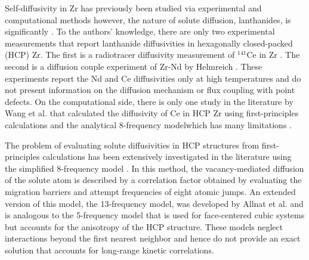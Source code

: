 \documentclass[preprint,12pt]{elsarticle}
\providecommand{\DIFadd}[1]{{\bf #1}} %
\providecommand{\DIFdel}[1]{} %
\providecommand{\DIFaddbegin}{\protect\color{blue}} %
\providecommand{\DIFaddend}{\protect\color{black}} %
\providecommand{\DIFdelbegin}{\protect\color{red}} %
\providecommand{\DIFdelend}{\protect\color{black}} %
\newcommand{\DIFscaledelfig}{0.5}
\newlength{\DIFdelgraphicswidth} %
\newlength{\DIFdelgraphicsheight} %
\newcommand{\DIFaddincludegraphics}[2][]{{\color{blue}\fbox{\DIFOincludegraphics[#1]{#2}}}} %
\newcommand{\DIFdelincludegraphics}[2][]{%
\sbox{\DIFdelgraphicsbox}{\DIFOincludegraphics[#1]{#2}}%
\settoboxwidth{\DIFdelgraphicswidth}{\DIFdelgraphicsbox} %
\settoboxtotalheight{\DIFdelgraphicsheight}{\DIFdelgraphicsbox} %
\scalebox{\DIFscaledelfig}{%
\parbox[b]{\DIFdelgraphicswidth}{\usebox{\DIFdelgraphicsbox}\\[-\baselineskip] \rule{\DIFdelgraphicswidth}{0em}}\llap{\resizebox{\DIFdelgraphicswidth}{\DIFdelgraphicsheight}{%
\setlength{\unitlength}{\DIFdelgraphicswidth}%
\begin{picture}(1,1)%
\thicklines\linethickness{2pt} %
{\color[rgb]{1,0,0}\put(0,0){\framebox(1,1){}}}%
{\color[rgb]{1,0,0}\put(0,0){\line( 1,1){1}}}%
{\color[rgb]{1,0,0}\put(0,1){\line(1,-1){1}}}%
\end{picture}%
}\hspace*{3pt}}} %
} %
\DeclareRobustCommand{\DIFaddbegin}{\DIFOaddbegin \let\includegraphics\DIFaddincludegraphics} %
\DeclareRobustCommand{\DIFaddend}{\DIFOaddend \let\includegraphics\DIFOincludegraphics} %
\DeclareRobustCommand{\DIFdelbegin}{\DIFOdelbegin \let\includegraphics\DIFdelincludegraphics} %
\DeclareRobustCommand{\DIFdelend}{\DIFOaddend \let\includegraphics\DIFOincludegraphics} %
\begin{document}
Self-diffusivity in Zr has previously been studied via experimental \cite{hood_alpha-zr_1995, hood_self-_1997} and computational methods \cite{samolyuk_analysis_2014, verite_anisotropy_2007, pasianot_issues_2012}\DIFdelbegin \DIFdel{, }\DIFdelend \DIFaddbegin \DIFadd{; }\DIFaddend however, the nature of solute diffusion, \DIFdelbegin \DIFdel{especially }\DIFdelend \DIFaddbegin \DIFadd{in particular }\DIFaddend lanthanides, is significantly \DIFdelbegin \DIFdel{less well-explored}\DIFdelend \DIFaddbegin \DIFadd{under-explored}\DIFaddend . To the authors' knowledge, there are only two experimental measurements that report lanthanide diffusivities in hexagonally closed-packed (HCP) Zr. The first is a radiotracer diffusivity measurement of $^{141}$Ce in Zr \cite{paul_diffusion_1968}. The second is a diffusion couple experiment of Zr-Nd by Helmreich \cite{helmreich_diffusion_2014}. These experiments report the Nd and Ce diffusivities only at high temperatures and do not present information on the diffusion mechanism or flux coupling with point defects. On the computational side, there is only one study in the literature by Wang et al. \cite{wang_first_2019} that calculated the diffusivity of Ce in HCP Zr using first-principles calculations and the analytical 8-frequency model\DIFaddbegin \DIFadd{, }\DIFaddend which has many limitations \cite{agarwal_exact_2017}. 

The problem of evaluating solute diffusivities in HCP structures from first-principles calculations has been extensively investigated in the literature \cite{ganeshan_first-principles_2011, lu_first-principles_2018, wang_first_2019} using the simplified 8-frequency model \cite{ghate_screened_1964, batra_anisotropic_1967}. In this method, the vacancy-mediated diffusion of the solute atom is described by a correlation factor obtained by evaluating the migration barriers and attempt frequencies of eight atomic jumps. An extended version of this model, the 13-frequency model, was developed by Allnat et al. \cite{allnatt_atomic_2003} and is analogous to the 5-frequency model that is used for face-centered cubic \DIFaddbegin \DIFadd{(FCC) }\DIFaddend systems but accounts for the anisotropy of the HCP structure. These models neglect interactions beyond the first nearest neighbor and hence do not provide an exact solution that accounts for long-range kinetic correlations. 
\end{document}
